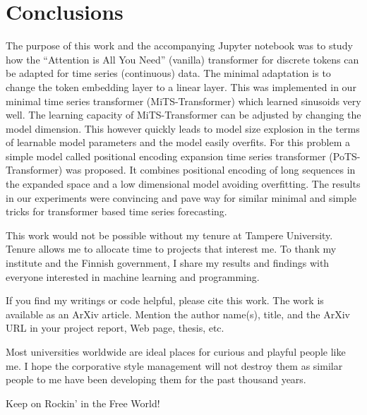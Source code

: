 \documentclass[final]{article}
\begin{document}
\section{Conclusions}
The purpose of this work and the accompanying Jupyter notebook was to study how the ``Attention is All You Need'' (vanilla) transformer for discrete tokens can be adapted for time series (continuous) data. The minimal adaptation is to change the token embedding layer to a linear layer. This was implemented in our minimal time series transformer (MiTS-Transformer) which learned sinusoids very well. The learning capacity of MiTS-Transformer can be adjusted by changing the model dimension. This however quickly leads to model size explosion in the terms of learnable model parameters and the model easily overfits. For this problem a simple model called positional encoding expansion time series transformer (PoTS-Transformer) was proposed. It combines positional encoding of long sequences in the expanded space and a low dimensional model avoiding overfitting. The results in our experiments were convincing and pave way for similar minimal and simple tricks for transformer based time series forecasting.

\begin{ack}
This work would not be possible without my tenure at Tampere University. Tenure allows me to allocate time to projects that interest me. To thank my institute and the Finnish government, I share my results and findings with everyone interested in machine learning and programming.

If you find my writings or code helpful, please cite this work. The work is available as an ArXiv article. Mention the author name(s), title, and the ArXiv URL in your project report, Web page, thesis, etc.

Most universities worldwide are ideal places for curious and playful people like me. I hope the corporative style management will not destroy them as similar people to me have been developing them for the past thousand years.

Keep on Rockin' in the Free World!
\end{ack}

\printbibliography
\end{document}
